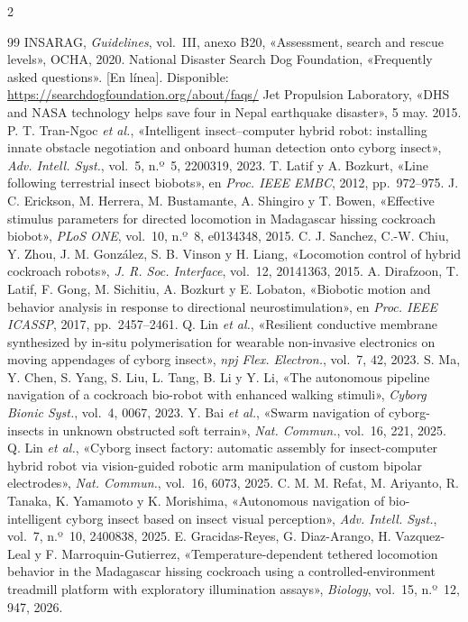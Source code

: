 \begin{multicols}{2}
\begin{thebibliography}{99}
 INSARAG, \textit{Guidelines}, vol.~III, anexo B20, «Assessment, search and rescue levels», OCHA, 2020.
 National Disaster Search Dog Foundation, «Frequently asked questions». [En línea]. Disponible: \url{https://searchdogfoundation.org/about/faqs/}
 Jet Propulsion Laboratory, «DHS and NASA technology helps save four in Nepal earthquake disaster», 5 may. 2015.
 P. T. Tran-Ngoc \textit{et al.}, «Intelligent insect--computer hybrid robot: installing innate obstacle negotiation and onboard human detection onto cyborg insect», \textit{Adv. Intell. Syst.}, vol.~5, n.º~5, 2200319, 2023.
 T. Latif y A. Bozkurt, «Line following terrestrial insect biobots», en \textit{Proc. IEEE EMBC}, 2012, pp.~972--975.
 J. C. Erickson, M. Herrera, M. Bustamante, A. Shingiro y T. Bowen, «Effective stimulus parameters for directed locomotion in Madagascar hissing cockroach biobot», \textit{PLoS ONE}, vol.~10, n.º~8, e0134348, 2015.
 C. J. Sanchez, C.-W. Chiu, Y. Zhou, J. M. González, S. B. Vinson y H. Liang, «Locomotion control of hybrid cockroach robots», \textit{J. R. Soc. Interface}, vol.~12, 20141363, 2015.
 A. Dirafzoon, T. Latif, F. Gong, M. Sichitiu, A. Bozkurt y E. Lobaton, «Biobotic motion and behavior analysis in response to directional neurostimulation», en \textit{Proc. IEEE ICASSP}, 2017, pp.~2457--2461.
 Q. Lin \textit{et al.}, «Resilient conductive membrane synthesized by in-situ polymerisation for wearable non-invasive electronics on moving appendages of cyborg insect», \textit{npj Flex. Electron.}, vol.~7, 42, 2023.
 S. Ma, Y. Chen, S. Yang, S. Liu, L. Tang, B. Li y Y. Li, «The autonomous pipeline navigation of a cockroach bio-robot with enhanced walking stimuli», \textit{Cyborg Bionic Syst.}, vol.~4, 0067, 2023.
 Y. Bai \textit{et al.}, «Swarm navigation of cyborg-insects in unknown obstructed soft terrain», \textit{Nat. Commun.}, vol.~16, 221, 2025.
 Q. Lin \textit{et al.}, «Cyborg insect factory: automatic assembly for insect-computer hybrid robot via vision-guided robotic arm manipulation of custom bipolar electrodes», \textit{Nat. Commun.}, vol.~16, 6073, 2025.
 C. M. M. Refat, M. Ariyanto, R. Tanaka, K. Yamamoto y K. Morishima, «Autonomous navigation of bio-intelligent cyborg insect based on insect visual perception», \textit{Adv. Intell. Syst.}, vol.~7, n.º~10, 2400838, 2025.
 E. Gracidas-Reyes, G. Diaz-Arango, H. Vazquez-Leal y F. Marroquin-Gutierrez, «Temperature-dependent tethered locomotion behavior in the Madagascar hissing cockroach using a controlled-environment treadmill platform with exploratory illumination assays», \textit{Biology}, vol.~15, n.º~12, 947, 2026.

\end{thebibliography}
\end{multicols}
